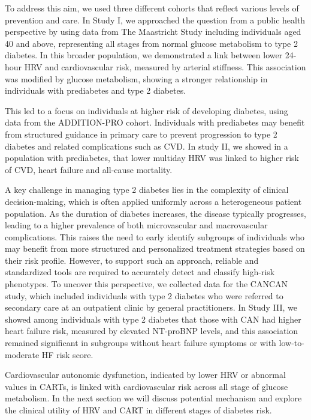 \documentclass[
  a4paper,
  headsepline=true,
  open=any]{scrbook}
\begin{document}
To address this aim, we used three different cohorts that reflect
various levels of prevention and care. In Study I, we approached the
question from a public health perspective by using data from The
Maastricht Study including individuals aged 40 and above, representing
all stages from normal glucose metabolism to type 2 diabetes. In this
broader population, we demonstrated a link between lower 24-hour HRV and
cardiovascular risk, measured by arterial stiffness. This association
was modified by glucose metabolism, showing a stronger relationship in
individuals with prediabetes and type 2 diabetes.

This led to a focus on individuals at higher risk of developing
diabetes, using data from the ADDITION-PRO cohort. Individuals with
prediabetes may benefit from structured guidance in primary care to
prevent progression to type 2 diabetes and related complications such as
CVD. In study II, we showed in a population with prediabetes, that lower
multiday HRV was linked to higher risk of CVD, heart failure and
all-cause mortality.

A key challenge in managing type 2 diabetes lies in the complexity of
clinical decision-making, which is often applied uniformly across a
heterogeneous patient population. As the duration of diabetes increases,
the disease typically progresses, leading to a higher prevalence of both
microvascular and macrovascular complications. This raises the need to
early identify subgroups of individuals who may benefit from more
structured and personalized treatment strategies based on their risk
profile. However, to support such an approach, reliable and standardized
tools are required to accurately detect and classify high-risk
phenotypes. To uncover this perspective, we collected data for the
CANCAN study, which included individuals with type 2 diabetes who were
referred to secondary care at an outpatient clinic by general
practitioners. In Study III, we showed among individuals with type 2
diabetes that those with CAN had higher heart failure risk, measured by
elevated NT-proBNP levels, and this association remained significant in
subgroups without heart failure symptoms or with low-to-moderate HF risk
score.

Cardiovascular autonomic dysfunction, indicated by lower HRV or abnormal
values in CARTs, is linked with cardiovascular risk across all stage of
glucose metabolism. In the next section we will discuss potential
mechanism and explore the clinical utility of HRV and CART in different
stages of diabetes risk.
\end{document}
